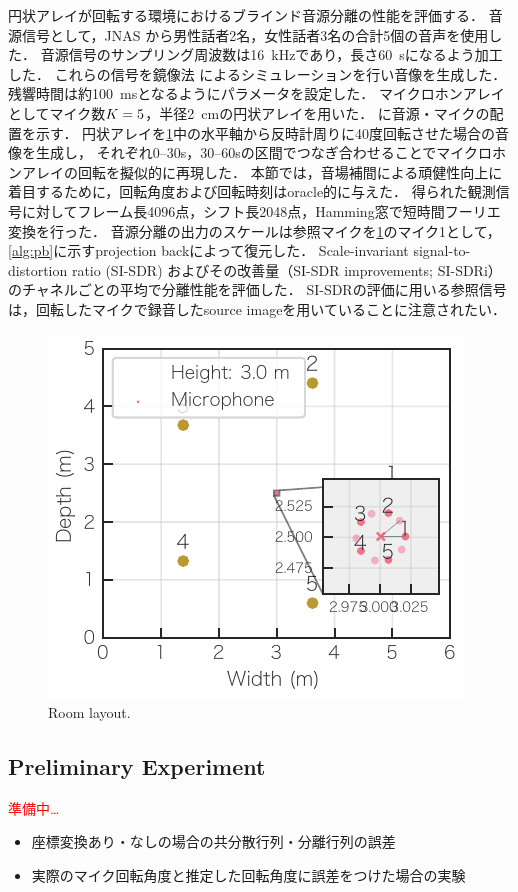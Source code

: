 \documentclass[sip,biber]{now-journal}
\newcommand{\todo}[1]{\textcolor{red}{#1}}
\begin{document}
円状アレイが回転する環境におけるブラインド音源分離の性能を評価する．
音源信号として，JNAS \cite{Itou:1999:AST}から男性話者2名，女性話者3名の合計5個の音声を使用した．
音源信号のサンプリング周波数は\SI{16}{\kilo\hertz}であり，長さ\SI{60}{\second}になるよう加工した．
これらの信号を鏡像法 \cite{Allen:1979:JASA} によるシミュレーションを行い音像を生成した．
残響時間は約\SI{100}{\milli\second}となるようにパラメータを設定した．
マイクロホンアレイとしてマイク数$K = 5$，半径\SI{2}{\cm}の円状アレイを用いた．
に音源・マイクの配置を示す．
円状アレイを\cref{fig:layout}中の水平軸から反時計周りに40度回転させた場合の音像を生成し，
それぞれ0--30\si{\second}，30--60\si{\second}の区間でつなぎ合わせることでマイクロホンアレイの回転を擬似的に再現した．
本節では，音場補間による頑健性向上に着目するために，回転角度および回転時刻はoracle的に与えた．
得られた観測信号に対してフレーム長4096点，シフト長2048点，Hamming窓で短時間フーリエ変換を行った．
音源分離の出力のスケールは参照マイクを\cref{fig:layout}のマイク1として，\cref{alg:pb}に示すprojection backによって復元した．
Scale-invariant signal-to-distortion ratio (SI-SDR) \cite{LeRoux:2019:ICASSP} およびその改善量（SI-SDR improvements; SI-SDRi）のチャネルごとの平均で分離性能を評価した．
SI-SDRの評価に用いる参照信号は，回転したマイクで録音したsource imageを用いていることに注意されたい．
\begin{figure}[t]
  \centering
  \includegraphics{figures/room_layout.pdf}
  \caption{Room layout.}%
  \label{fig:layout}
\end{figure}

\subsection{Preliminary Experiment}
\todo{準備中…}
\begin{itemize}
  \color{red}
  \item 座標変換あり・なしの場合の共分散行列・分離行列の誤差
  \item 実際のマイク回転角度と推定した回転角度に誤差をつけた場合の実験
\end{itemize}
\end{document}
